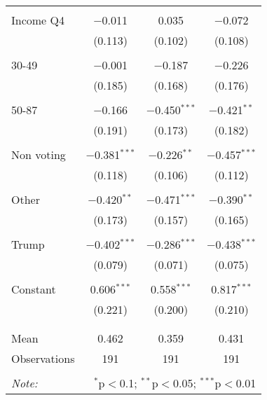 \begin{tabular}{@{\extracolsep{5pt}}lccc}
  & & & \\ 
 Income Q4 & $-$0.011 & 0.035 & $-$0.072 \\ 
  & (0.113) & (0.102) & (0.108) \\ 
  & & & \\ 
 30-49 & $-$0.001 & $-$0.187 & $-$0.226 \\ 
  & (0.185) & (0.168) & (0.176) \\ 
  & & & \\ 
 50-87 & $-$0.166 & $-$0.450$^{***}$ & $-$0.421$^{**}$ \\ 
  & (0.191) & (0.173) & (0.182) \\ 
  & & & \\ 
 Non voting & $-$0.381$^{***}$ & $-$0.226$^{**}$ & $-$0.457$^{***}$ \\ 
  & (0.118) & (0.106) & (0.112) \\ 
  & & & \\ 
 Other & $-$0.420$^{**}$ & $-$0.471$^{***}$ & $-$0.390$^{**}$ \\ 
  & (0.173) & (0.157) & (0.165) \\ 
  & & & \\ 
 Trump & $-$0.402$^{***}$ & $-$0.286$^{***}$ & $-$0.438$^{***}$ \\ 
  & (0.079) & (0.071) & (0.075) \\ 
  & & & \\ 
 Constant & 0.606$^{***}$ & 0.558$^{***}$ & 0.817$^{***}$ \\ 
  & (0.221) & (0.200) & (0.210) \\ 
  & & & \\ 
\hline \\[-1.8ex] 
Mean & 0.462 & 0.359 & 0.431 \\ 
Observations & 191 & 191 & 191 \\ 
\hline 
\hline \\[-1.8ex] 
\textit{Note:}  & \multicolumn{3}{r}{$^{*}$p$<$0.1; $^{**}$p$<$0.05; $^{***}$p$<$0.01} \\ 
\end{tabular} 
